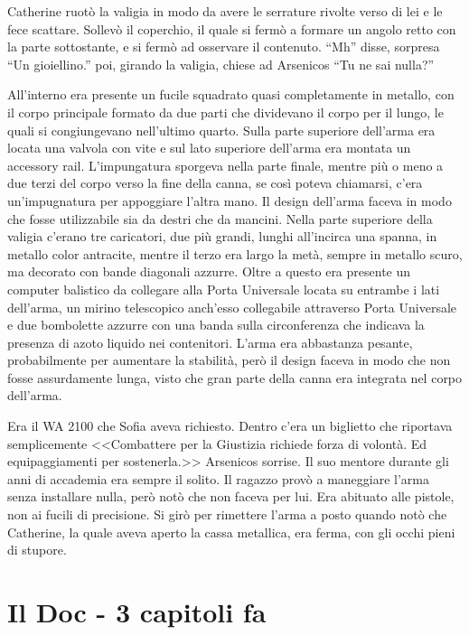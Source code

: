     Catherine ruotò la valigia in modo da avere le serrature rivolte verso di lei e le fece scattare. Sollevò il
    coperchio, il quale si fermò a formare un angolo retto con la parte sottostante, e si fermò ad osservare il
    contenuto. ``Mh'' disse, sorpresa ``Un gioiellino.'' poi, girando la valigia, chiese ad Arsenicos ``Tu ne sai
    nulla?''

    All'interno era presente un fucile squadrato quasi completamente in metallo, con il corpo principale formato da due
    parti che dividevano il corpo per il lungo, le quali si congiungevano nell'ultimo quarto. Sulla parte superiore
    dell'arma era locata una valvola con vite e sul lato superiore dell'arma era montata un accessory rail. L'impungatura
    sporgeva nella parte finale, mentre più o meno a due terzi del corpo verso la fine della canna, se così
    poteva chiamarsi, c'era un'impugnatura per appoggiare l'altra mano. Il design dell'arma faceva in modo che fosse
    utilizzabile sia da destri che da mancini. Nella parte superiore della valigia c'erano tre caricatori, due più
    grandi, lunghi all'incirca una spanna, in metallo color antracite, mentre il terzo era largo la metà, sempre in
    metallo scuro, ma decorato con bande diagonali azzurre. Oltre a questo era presente un computer balistico da
    collegare alla Porta Universale locata su entrambe i lati dell'arma, un mirino telescopico anch'esso collegabile
    attraverso Porta Universale e due bombolette azzurre con una banda sulla circonferenza che indicava la presenza di
    azoto liquido nei contenitori. L'arma era abbastanza pesante, probabilmente per aumentare la stabilità, però il
    design faceva in modo che non fosse assurdamente lunga, visto che gran parte della canna era integrata nel corpo
    dell'arma.

    Era il WA 2100 che Sofia aveva richiesto. Dentro c'era un biglietto che riportava semplicemente <<Combattere per la
    Giustizia richiede forza di volontà. Ed equipaggiamenti per sostenerla.>> Arsenicos sorrise. Il suo mentore durante
    gli anni di accademia era sempre il solito. Il ragazzo provò a maneggiare l'arma senza installare nulla, però notò
    che non faceva per lui. Era abituato alle pistole, non ai fucili di precisione. Si girò per rimettere l'arma a posto
    quando notò che Catherine, la quale aveva aperto la cassa metallica, era ferma, con gli occhi pieni di stupore.

  \section*{Il Doc - 3 capitoli fa}


